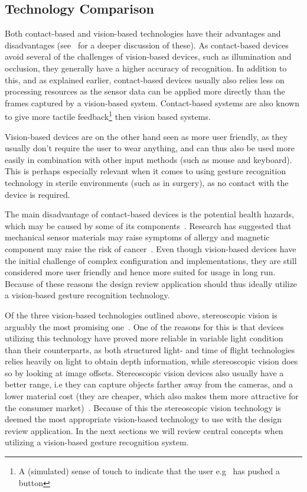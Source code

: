 \subsection{Technology Comparison}
Both contact-based and vision-based technologies have their advantages and disadvantages (see~\citet{Rautaray2015} for a deeper discussion of these). 
As contact-based devices avoid several of the challenges of vision-based devices, such as illumination and occlusion, they generally have a higher accuracy of recognition.
In addition to this, and as explained earlier, contact-based devices usually also relies less on processing resources as the sensor data can be applied more directly than the
frames captured by a vision-based system. Contact-based systems are also known to give more tactile feedback\footnote{A (simulated) sense of touch to indicate that the user e.g~
has pushed a button} then vision based systems.

Vision-based devices are on the other hand seen as more user friendly, as they usually don't require the user to wear anything, and can thus also be used more easily
in combination with other input methods (such as mouse and keyboard). This is perhaps especially relevant when it comes to using gesture recognition technology in
sterile environments (such as in surgery), as no contact with the device is required. 

The main disadvantage of contact-based devices is the potential health hazards, which may be caused by some of its components~\citep{Schultz2003}. 
Research has suggested that mechanical sensor materials may raise symptoms of allergy and magnetic component may raise the risk of cancer~\citep{Nishikawa2003}. 
Even though vision-based devices have the initial challenge of complex configuration and implementations, 
they are still considered more user friendly and hence more suited for usage in long run. 
Because of these reasons the design review application should thus ideally utilize a vision-based gesture recognition technology. 

Of the three vision-based technologies outlined above, stereoscopic vision is arguably the most promising one~\citep{Ko2012}.
One of the reasons for this is that devices utilizing this technology have proved more reliable in variable light condition than their counterparts, 
as both structured light- and time of flight technologies relies heavily on light to obtain depth information, while stereoscopic vision does so by looking at image offsets.
Stereoscopic vision devices also usually have a better range, i.e they can capture objects farther away from the cameras, and 
a lower material cost (they are cheaper, which also makes them more attractive for the consumer market)~\citep{Ko2012}.
Because of this the stereoscopic vision technology is deemed the most appropriate vision-based technology to use with the design review application.
In the next sections we will review central concepts when utilizing a vision-based gesture recognition system.

